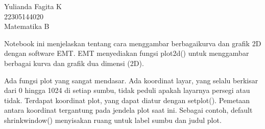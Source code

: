 \documentclass[a4paper,10pt]{article}
\begin{document}
\begin{eulernotebook}
\eulersubheading{}
\begin{eulercomment}
Yulianda Fagita K\\
22305144020\\
Matematika B\\
\end{eulercomment}
\eulersubheading{}
\begin{eulercomment}
\begin{eulercomment}
\begin{eulercomment}
Notebook ini menjelaskan tentang cara menggambar berbagaikurva dan
grafik 2D dengan software EMT. EMT menyediakan fungsi plot2d() untuk
menggambar berbagai kurva dan grafik dua dimensi (2D).

\end{eulercomment}
\begin{eulercomment}
Ada fungsi plot yang sangat mendasar. Ada koordinat layar, yang selalu
berkisar dari 0 hingga 1024 di setiap sumbu, tidak peduli apakah
layarnya persegi atau tidak. Terdapat koordinat plot, yang dapat
diatur dengan setplot(). Pemetaan antara koordinat tergantung pada
jendela plot saat ini. Sebagai contoh, default shrinkwindow()
menyisakan ruang untuk label sumbu dan judul plot.


\end{eulercomment}
\end{eulercomment}
\end{eulercomment}
\end{eulernotebook}
\end{document}
